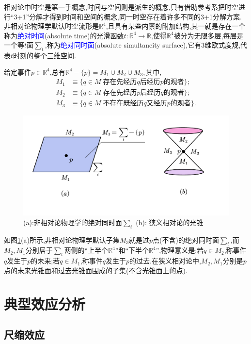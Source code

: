 相对论中时空是第一手概念,时间与空间则是派生的概念,只有借助参考系把时空进行“3+1”分解才得到时间和空间的概念,同一时空存在着许多不同的3+1分解方案.非相对论物理学默认时空流形是$\mathbb{R}^4$,且具有某些内禀的附加结构,其一就是存在一个称为\textcolor{blue}{绝对时间}(absolute time)的光滑函数$t:\mathbb{R}^4\to\mathbb{R}$,使得$\mathbb{R}^4$被分为无限多层,每层是一个等$t$面$\sum_t$,称为\textcolor{blue}{绝对同时面}(absolute simultaneity surface),它有3维欧式度规,代表$t$时刻的整个三维空间.

给定事件$p\in \mathbb{R}^4$,总有$\mathbb{R}^4-\{p\}=M_1\cup M_2\cup M_3,$其中,
$$
\begin{aligned}
    M_1&\equiv\{q\in M|\text{存在先经历}q\text{后经历}p\text{的观者}\};\\
    M_2&\equiv\{q\in M|\text{存在先经历}p\text{后经历}q\text{的观者}\};\\
    M_3&\equiv\{q\in M|\text{不存在既经历}q\text{又经历}p\text{的观者}\}.
\end{aligned}
$$
\begin{figure}[htbp]
    \centering
    \includegraphics[width=\textwidth]{Pictures/6-7.png}
    \caption{(a):非相对论物理学的绝对同时面$\sum_t$
    (b): 狭义相对论的光锥}
    \label{fig:6-7}
\end{figure}

如图\ref{fig:6-7}(a)所示,非相对论物理学默认子集$M_3$就是过$p$点(不含)的绝对同时面$\sum_t$,而$M_2,M_1$分别居于$\sum_t$两侧的“上半个$\mathbb{R}^4$”和“下半个$\mathbb{R}^4$”,物理意义是:若$q\in M_2$,称事件$q$发生于$p$的未来;若$q\in M_1$,称事件$q$发生于$p$的过去.在狭义相对论中,$M_2,M_1$分别是$p$点的未来光锥面和过去光锥面围成的子集(不含光锥面上的点).

\section{典型效应分析}
\subsection{尺缩效应}

